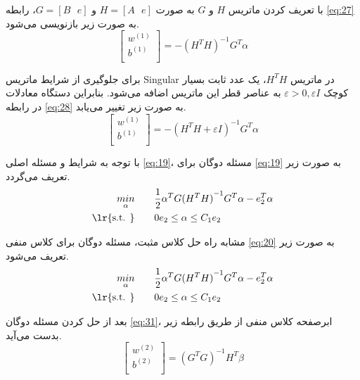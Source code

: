 با تعریف کردن ماتریس $H$ و $G$ به صورت $H=[A\text{ }e]$ و $G=[B\text{ }e]$، رابطه \ref{eq:27} به صورت زیر بازنویسی می‌شود.
\begin{equation}
\left[ \begin{matrix}
{{w}^{(1)}} \\
{{b}^{(1)}} \\
\end{matrix} \right]= -{{({{H}^{T}}H)}^{-1}}{{G}^{T}}\alpha
\label{eq:28}
\end{equation}

برای جلوگیری از شرایط ماتریس \gls{Singular} در ماتریس $H^{T}H$، یک عدد ثابت بسیار کوچک  $\varepsilon > 0, \varepsilon I$ به عناصر قطر این ماتریس اضافه می‌شود. بنابراین دستگاه معادلات در رابطه \ref{eq:28} به صورت زیر تغییر می‌یابد.
\begin{equation}
\left[ \begin{matrix}
{{w}^{(1)}} \\
{{b}^{(1)}} \\
\end{matrix}\right]= -{{({{H}^{T}}H + \varepsilon I)}^{-1}}{{G}^{T}}\alpha
\label{eq:29}
\end{equation}

با توجه به شرایط  و مسئله اصلی \ref{eq:19}، مسئله دوگان برای \ref{eq:19} به صورت زیر تعریف می‌گردد.
\begin{equation}
\begin{split}
\mathop{{ min}}\limits_{\alpha} \qquad & \frac{1}{2}{{\alpha }^{T}}G{{({{H}^{T}}H)}^{-1}}{{G}^{T}}\alpha -e_{2}^{T}\alpha  \\
\textrm{\lr{s.t. }} \qquad & 0{{e}_{2}}\le \alpha \le {{C}_{1}}{{e}_{2}}
\end{split}
\label{eq:30}
\end{equation}

مشابه راه حل کلاس مثبت، مسئله دوگان برای کلاس منفی \ref{eq:20} به صورت زیر تعریف می‌شود.
\begin{equation}
\begin{split}
\mathop{{ min}}\limits_{\alpha} \qquad & \frac{1}{2}{{\alpha }^{T}}G{{({{H}^{T}}H)}^{-1}}{{G}^{T}}\alpha -e_{2}^{T}\alpha  \\
\textrm{\lr{s.t. }} \qquad & 0{{e}_{2}}\le \alpha \le {{C}_{1}}{{e}_{2}}
\end{split}
\label{eq:31}
\end{equation}

بعد از حل کردن مسئله دوگان \ref{eq:31}، ابرصفحه کلاس منفی از طریق رابطه زیر بدست می‌آید.
\begin{equation}
\left[ \begin{matrix}
{{w}^{(2)}} \\
{{b}^{(2)}} \\
\end{matrix}\right]= {{({{G}^{T}}G)}^{-1}}{{H}^{T}}\beta
\label{eq:32}
\end{equation}


